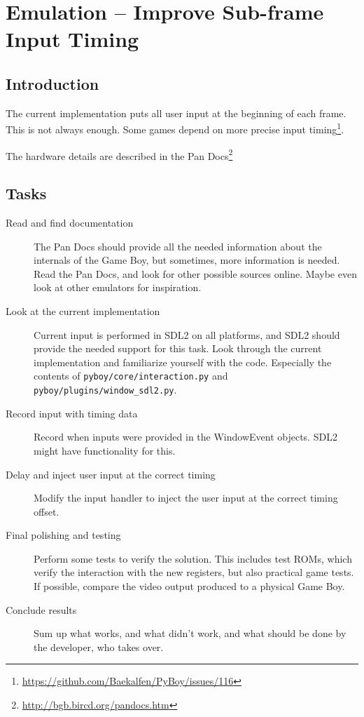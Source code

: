 \documentclass[11pt]{report} %
\begin{document}
\chapter*{Emulation -- Improve Sub-frame Input Timing}
\section*{Introduction}
The current implementation puts all user input at the beginning of each frame. This is not always enough. Some games depend on more precise input timing\footnote{\url{https://github.com/Baekalfen/PyBoy/issues/116}}.

The hardware details are described in the Pan Docs\footnote{\url{http://bgb.bircd.org/pandocs.htm}}

\section*{Tasks}
\begin{description}
    \item [Read and find documentation]
        The Pan Docs should provide all the needed information about the internals of the Game Boy, but sometimes, more information is needed. Read the Pan Docs, and look for other possible sources online. Maybe even look at other emulators for inspiration.

    \item [Look at the current implementation]
        Current input is performed in SDL2 on all platforms, and SDL2 should provide the needed support for this task. Look through the current implementation and familiarize yourself with the code. Especially the contents of \texttt{pyboy/core/interaction.py} and \texttt{pyboy/plugins/window\_sdl2.py}.

    \item [Record input with timing data]
        Record when inputs were provided in the WindowEvent objects. SDL2 might have functionality for this.

    \item [Delay and inject user input at the correct timing]
        Modify the input handler to inject the user input at the correct timing offset.

    \item [Final polishing and testing]
        Perform some tests to verify the solution. This includes test ROMs, which verify the interaction with the new registers, but also practical game tests. If possible, compare the video output produced to a physical Game Boy.

    \item [Conclude results]
        Sum up what works, and what didn't work, and what should be done by the developer, who takes over.

\end{description}
\end{document}
